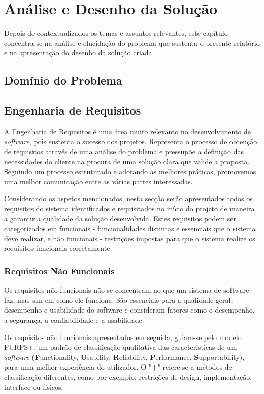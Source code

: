 \chapter{Análise e Desenho da Solução}
\label{sec:3-Analise}

Depois de contextualizados os temas e assuntos relevantes, este capítulo concentra-se na análise 
e elucidação do problema que sustenta o presente relatório e na apresentação do desenho da 
solução criada.

\section{Domínio do Problema}


\section{Engenharia de Requisitos}

A Engenharia de Requisitos é uma área muito relevanto no desenvolvimento de \textit{software}, pois 
sustenta o sucesso dos projetos. Representa o processo de obtenção de requisitos através de uma análise 
do problema e pressupõe a definição das necessidades do cliente na procura de uma solução clara 
que valide a proposta. Seguindo um processo estruturado e adotando as melhores práticas, 
promovemos uma melhor comunicação entre as várias partes interessadas.

Considerando os aspetos mencionados, nesta secção serão apresentados todos os 
requisitos do sistema identificados e requisitados no início do projeto de maneira a garantir a 
qualidade da solução desenvolvida. Estes requisitos podem ser categorizados em funcionais - 
funcionalidades distintas e essenciais que o sistema deve realizar, e não funcionais - 
restrições impostas para que o sistema realize os requisitos funcionais corretamente.

\subsection{Requisitos Não Funcionais}

Os requisitos não funcionais não se concentram no que um sistema de software faz, mas sim em como 
ele funciona. São essenciais para a qualidade geral, desempenho e usabilidade do software e 
consideram fatores como o desempenho, a segurança, a confiabilidade e a usabilidade.

Os requisitos não funcionais apresentados em seguida, guiam-se pelo modelo FURPS+, um padrão de 
classificação qualitativa das características de um \textit{software}
(\textbf{F}unctionality, \textbf{U}sability, \textbf{R}eliability, \textbf{P}erformance, \textbf{S}upportability), 
para uma melhor experiência do utilizador. O "\textbf{+}" refere-se a métodos de classificação 
diferentes, como por exemplo, restrições de design, implementação, interface ou físicos.


